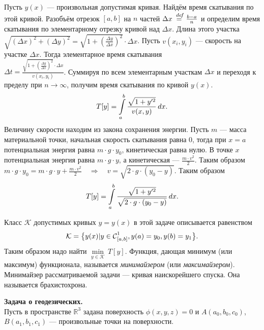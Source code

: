 \documentclass[12pt,a4paper,openany,fleqn]{book}
\newcommand {\defeq}{\stackrel{\hspace{0.09 cm}de\!f}{=}}
\newcommand {\eqdef}{\defeq}
\newcommand{\Cf}{\ensuremath{\mathcal{C}}}
\newcommand{\mc}[1]{\ensuremath{\mathcal{#1}}}
\newcommand{\Cfn}[2][]{\ensuremath{\Cf{\mathstrut}^{#2}_{#1}}}
\newcommand{\dd}{\ensuremath{d}}
\theoremstyle{definition}
\begin{document}
\begin{enumerate2}
\begin{tikzpicture}[x=0.75pt,y=0.75pt,yscale=-1,xscale=1]
			
		\end{tikzpicture}
		
		Пусть $y(x)$ --- произвольная допустимая кривая. Найдём время скатывания по этой кривой. Разобъём отрезок ${[a,b]}$ на $n$ частей $\Delta x\eqdef\frac{b-a}{n}$ и определим время скатывания по элементарному отрезку кривой над $\Delta x$. Длина этого участка $\sqrt{(\Delta x)^2+(\Delta y)^2}=\sqrt{1+\left(\frac{\Delta y}{\Delta x}\right)^2}\cdot \Delta x$. Пусть $v(x_i, y_i)$ --- скорость на участке $\Delta x$. Тогда элементарное время скатывания \\
		$\Delta t= \displaystyle \frac{\sqrt{1+\left(\frac{\Delta y}{\Delta x}\right)^2}\cdot \Delta x}{v(x_i, y_i)}$. Суммируя по всем элементарным участкам $\Delta x$ и переходя к пределу при $n\to\infty$, получим время скатывания по кривой $y(x)$.
		\begin{equation*}
			\hfill T[y]=\int\limits_a^b\frac{\sqrt{1+y^{\prime 2}}}{v(x,y)}\,\dd{x}.\hfill
		\end{equation*}
		Величину скорости находим из закона сохранения энергии. Пусть $m$ --- масса материальной точки, начальная скорость скатывания равна 0, тогда при $x=a$ потенциальная энергия равна $m\cdot g\cdot y_0$, кинетическая равна нулю. В точке $x$ потенциальная энергия равна $m\cdot g\cdot y$, а кинетическая --- $\frac{m\cdot v^2}{2}$. Таким образом
		$m\cdot g\cdot y_0=m\cdot g\cdot y+\frac{m\cdot v^2}{2}\quad\Rightarrow \quad v=\sqrt{2\cdot g\cdot(y_0-y)}$. Таким образом  
		\begin{equation*}
			\hfill T[y]=\int\limits_a^b\frac{\sqrt{1+y^{\prime 2}}}{\sqrt{2\cdot g\cdot(y_0-y)}}\,\dd{x}.\hfill
		\end{equation*}
		
		Класс $\mc{K}$ допустимых кривых $y=y(x)$ в этой задаче описывается равенством 	
		\begin{equation*}
			\hfill\mc{K}=\big\{y(x)|y\in\Cfn[{[a,b]}]{1}, y(a)=y_0, y(b)=y_1\big\}.\hfill
		\end{equation*}
		Таким образом надо найти $\min\limits_{y\in\mc{K}}\,T[y]$. Функция, дающая минимум (или максимум) функционала, называется \emph{минимайзером} (или \emph{максимайзером}). Минимайзер рассматриваемой задачи --- кривая наискорейшего спуска. Она называется брахистохрона.
		
		\item \textbf{Задача о геодезических.}\\
		Пусть в пространстве $\mathbb{R}^3$ задана поверхность $\phi(x,y,z)=0$ и $A(a_0,b_0,c_0)$, $B(a_1,b_1,c_1)$ --- произвольные точки на поверхности.
		

\end{enumerate2}
\end{document}
